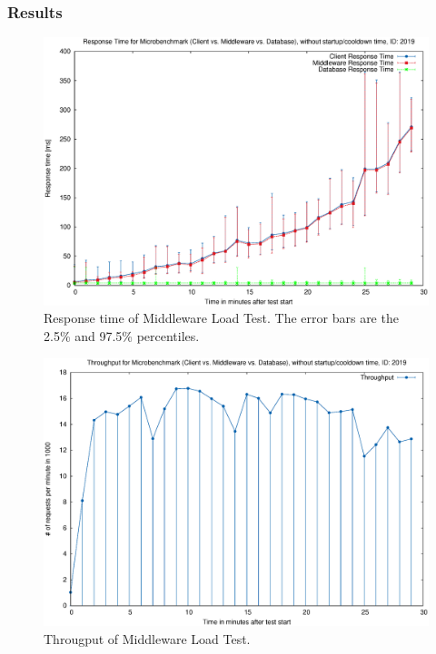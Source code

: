 \documentclass[milestone1.tex]{subfiles}
\begin{document}
\subsubsection{Results}

\begin{figure}[H]
        \begin{center}
    \includegraphics[scale=0.5]{../exported_plots/microbenchmarks/broker_stress_rt.eps}
  \end{center}
  \caption{Response time of Middleware Load Test. The error bars are the 2.5\% and 97.5\% percentiles.}
  \label{fig:BrokerLoadTestResponseTime}
\end{figure}

\begin{figure}[H]
        \begin{center}
    \includegraphics[scale=0.5]{../exported_plots/microbenchmarks/broker_stress_tp.eps}
  \end{center}
  \caption{Througput of Middleware Load Test.}
  \label{fig:BrokerLoadTestThroughput}
\end{figure}
\end{document}
